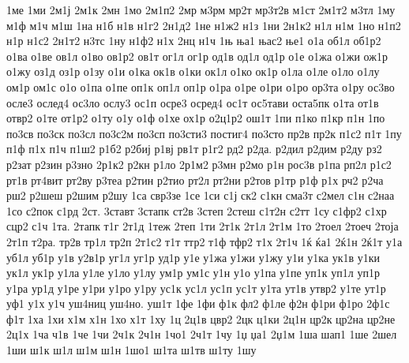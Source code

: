 {1ме
1ми
2м1ј
2м1к
2мн
1мо
2м1п2
2мр
м3рм
мр2т
мр3т2в
м1ст
2м1т2
м3тл
1му
м1ф
м1ч
м1ш
1на
н1б
н1в
н1г2
2н1д2
1не
н1ж2
н1з
1ни
2н1к2
н1л
н1м
1но
н1п2
н1р
н1с2
2н1т2
н3тс
1ну
н1ф2
н1х
2нц
н1ч
1њ
ња1
њас2
ње1
о1а
об1л
об1р2
о1ва
о1ве
ов1л
о1во
ов1р2
ов1т
ог1л
ог1р
од1в
од1л
од1р
о1е
о1жа
о1жи
ож1р
о1жу
оз1д
оз1р
о1зу
о1и
о1ка
ок1в
о1ки
ок1л
о1ко
ок1р
о1ла
о1ле
о1ло
о1лу
ом1р
ом1с
о1о
о1па
о1пе
оп1к
оп1л
оп1р
о1ра
о1ре
о1ри
о1ро
ор3та
о1ру
ос3во
осле3
ослед4
ос3ло
ослу3
ос1п
осре3
осред4
ос1т
ос5тави
оста5пк
о1та
от1в
отвр2
о1те
от1р2
о1ту
о1у
о1ф
о1хе
ох1р
о2ц1р2
ош1т
1пи
п1ко
п1кр
п1н
1по
по3св
по3ск
по3сл
по3с2м
по3сп
по3сти3
постиг4
по3сто
пр2в
пр2к
п1с2
п1т
1пу
п1ф
п1х
п1ч
п1ш2
р1б2
р2биј
р1вј
рв1т
р1г2
рд2
р2да.
р2дил
р2дим
р2ду
рз2
р2зат
р2зин
р3зно
2р1к2
р2кн
р1ло
2р1м2
р3мн
р2мо
р1н
рос3в
р1па
рп2л
р1с2
рт1в
рт4вит
рт2ву
р3теа
р2тин
р2тио
рт2л
рт2ни
р2тов
р1тр
р1ф
р1х
рч2
р2ча
рш2
р2шеш
р2шим
р2шу
1са
свр3зе
1се
1си
с1ј
ск2
с1кн
сма3т
с2мел
с1н
с2наа
1со
с2пок
с1рд
2ст.
3ставт
3стапк
ст2в
3степ
2стеш
с1т2н
с2тт
1су
с1фр2
с1хр
сцр2
с1ч
1та.
2тапк
т1г
2т1д
1теж
2теп
1ти
2т1к
2т1л
2т1м
1то
2тоел
2тоеч
2тоја
2т1п
т2ра.
тр2в
тр1л
тр2п
2т1с2
т1т
ттр2
т1ф
тфр2
т1х
2т1ч
1ќ
ќа1
2ќ1н
2ќ1т
у1а
уб1л
уб1р
у1в
у2в1р
уг1л
уг1р
уд1р
у1е
у1жа
у1жи
у1жу
у1и
у1ка
ук1в
у1ки
ук1л
ук1р
у1ла
у1ле
у1ло
у1лу
ум1р
ум1с
у1н
у1о
у1па
у1пе
уп1к
уп1л
уп1р
у1ра
ур1д
у1ре
у1ри
у1ро
у1ру
ус1к
ус1л
ус1п
ус1т
у1та
ут1в
утвр2
у1те
ут1р
уф1
у1х
у1ч
уш4ниц
уш4но.
уш1т
1фе
1фи
ф1к
фл2
ф1ле
ф2н
ф1ри
ф1ро
2ф1с
ф1т
1ха
1хи
х1м
х1н
1хо
х1т
1ху
1ц
2ц1в
цвр2
2цк
ц1ки
2ц1н
цр2к
цр2на
цр2не
2ц1х
1ча
ч1в
1че
1чи
2ч1к
2ч1н
1чо1
2ч1т
1чу
1џ
џа1
2џ1м
1ша
шап1
1ше
2шел
1ши
ш1к
ш1л
ш1м
ш1н
1шо1
ш1та
ш1тв
ш1ту
1шу
}
